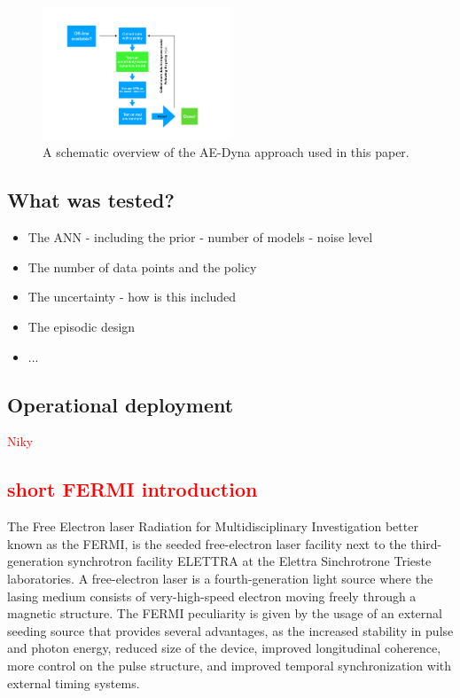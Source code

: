 \documentclass[
 reprint,
 amsmath,amssymb,amsfonts,clevref,
 aps,
prstab,
]{revtex4-2}
\newcommand{\NB}[1]{\textcolor{red}{#1}}
\begin{document}
\begin{figure}[!h]
	\centering
	\includegraphics*[width=0.5\textwidth]{Figures/MBRL_overview}
	\caption{A schematic overview of the AE-Dyna approach used in this paper.}
	\label{fig:MBRL_overview}
\end{figure}
\subsection{What was tested?}
\begin{itemize}
	\item The ANN - including the prior - number of models - noise level
	\item The number of data points and the policy
	\item The uncertainty - how is this included
	\item The episodic design
	\item ...
\end{itemize}
\subsection{Operational deployment}
\NB{Niky} %
\subsection{\NB{short FERMI introduction}}
The Free Electron laser Radiation for Multidisciplinary Investigation  better known as the FERMI, is the seeded free-electron laser facility next to the third-generation synchrotron facility ELETTRA at the Elettra Sinchrotrone Trieste laboratories.
A free-electron laser is a fourth-generation light source where the lasing medium consists of very-high-speed electron moving freely through a magnetic structure. The FERMI peculiarity is given by the usage of an external seeding source that provides several advantages, as the increased stability in pulse and photon energy, reduced size of the device, improved longitudinal coherence, more control on the pulse structure, and improved temporal synchronization with external timing systems.
\end{document}
